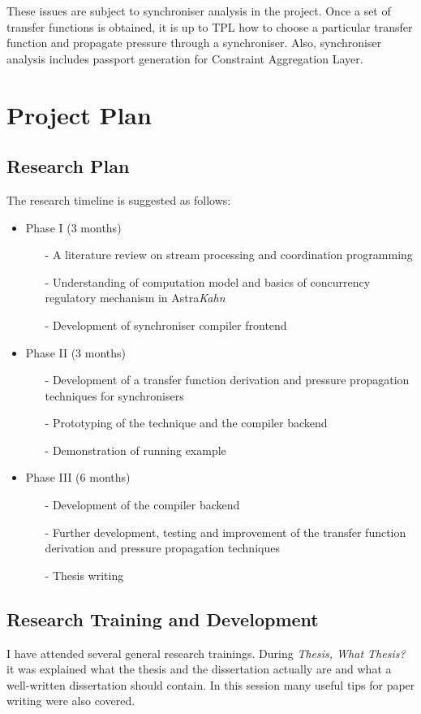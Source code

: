 \documentclass{article}
\begin{document}
These issues are subject to synchroniser analysis in the project. Once a set of transfer functions is obtained, it is up to TPL how to choose a particular transfer function and propagate pressure through a synchroniser. Also, synchroniser analysis includes passport generation for Constraint Aggregation Layer.

\section{Project Plan}
\subsection{Research Plan}
The research timeline is suggested as follows:
\begin{itemize}
\item Phase I (3 months)
	\begin{itemize}
	\item[-] A literature review on stream processing and coordination programming
	\item[-] Understanding of computation model and basics of concurrency regulatory mechanism in Astra\emph{Kahn}
	\item[-] Development of synchroniser compiler frontend
	\end{itemize}
\item Phase II (3 months)
	\begin{itemize}
	\item[-] Development of a transfer function derivation and pressure propagation techniques for synchronisers
	\item[-] Prototyping of the technique and the compiler backend
  \item[-] Demonstration of running example
	\end{itemize}
\item Phase III (6 months)
	\begin{itemize}
	\item[-] Development of the compiler backend
  \item[-] Further development, testing and improvement of the transfer function derivation and pressure propagation techniques
	\item[-] Thesis writing
	\end{itemize}
\end{itemize}

\subsection{Research Training and Development}
I have attended several general research trainings. During \emph{Thesis, What Thesis?} it was explained what the thesis and the dissertation actually are and what a well-written dissertation should contain. In this session many useful tips for paper writing were also covered.
\end{document}
